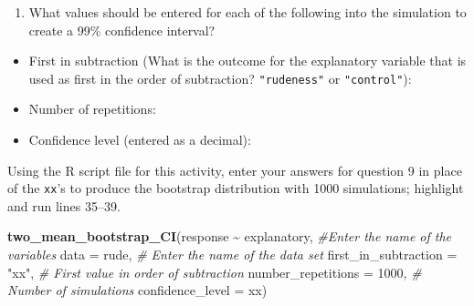 \documentclass[
]{report}
\newenvironment{Shaded}{\begin{snugshade}}{\end{snugshade}}
\newcommand{\AttributeTok}[1]{\textcolor[rgb]{0.13,0.29,0.53}{#1}}
\newcommand{\CommentTok}[1]{\textcolor[rgb]{0.56,0.35,0.01}{\textit{#1}}}
\newcommand{\DecValTok}[1]{\textcolor[rgb]{0.00,0.00,0.81}{#1}}
\newcommand{\FunctionTok}[1]{\textcolor[rgb]{0.13,0.29,0.53}{\textbf{#1}}}
\newcommand{\NormalTok}[1]{#1}
\newcommand{\SpecialCharTok}[1]{\textcolor[rgb]{0.81,0.36,0.00}{\textbf{#1}}}
\newcommand{\StringTok}[1]{\textcolor[rgb]{0.31,0.60,0.02}{#1}}
\providecommand{\tightlist}{%
  \setlength{\itemsep}{0pt}\setlength{\parskip}{0pt}}
\begin{document}
\begin{enumerate}
\def\labelenumi{\arabic{enumi}.}
\setcounter{enumi}{8}
\tightlist
\item
  What values should be entered for each of the following into the simulation to create a 99\% confidence interval?
  \vspace{.5mm}
\end{enumerate}

\begin{itemize}
\tightlist
\item
  First in subtraction (What is the outcome for the explanatory variable that is used as first in the order of subtraction? \texttt{"rudeness"} or \texttt{"control"}):
\end{itemize}

\vspace{.15in}

\begin{itemize}
\tightlist
\item
  Number of repetitions:
\end{itemize}

\vspace{.15in}

\begin{itemize}
\tightlist
\item
  Confidence level (entered as a decimal):
\end{itemize}

\vspace{.15in}

Using the R script file for this activity, enter your answers for question 9 in place of the \texttt{xx}'s to produce the bootstrap distribution with 1000 simulations; highlight and run lines 35--39.

\begin{Shaded}
\begin{Highlighting}[]
\FunctionTok{two\_mean\_bootstrap\_CI}\NormalTok{(response }\SpecialCharTok{\textasciitilde{}}\NormalTok{ explanatory, }\CommentTok{\#Enter the name of the variables}
                      \AttributeTok{data =}\NormalTok{ rude,  }\CommentTok{\# Enter the name of the data set}
                      \AttributeTok{first\_in\_subtraction =} \StringTok{"xx"}\NormalTok{, }\CommentTok{\# First value in order of subtraction}
                      \AttributeTok{number\_repetitions =} \DecValTok{1000}\NormalTok{,  }\CommentTok{\# Number of simulations}
                      \AttributeTok{confidence\_level =}\NormalTok{ xx)}
\end{Highlighting}
\end{Shaded}
\end{document}
